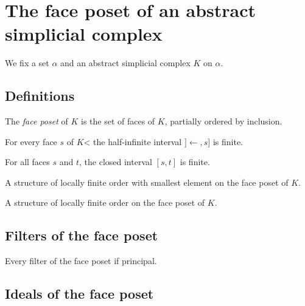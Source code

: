 \section{The face poset of an abstract simplicial complex}

We fix a set $\alpha$ and an abstract simplicial complex $K$ on $\alpha$.

\subsection{Definitions}

\begin{subdefi}[FacePoset] 
The \emph{face poset} of $K$ is the set of faces of $K$, partially ordered by inclusion.

\end{subdefi}

\begin{sublemma}
For every face $s$ of $K$< the half-infinite interval $]\leftarrow,s]$ is finite.

\end{sublemma}

\begin{sublemma}
For all faces $s$ and $t$, the closed interval $[s,t]$ is finite.

\end{sublemma}

\begin{subdefi}[FacePosetLFB]
A structure of locally finite order with smallest element on the face poset of $K$.

\end{subdefi}

\begin{subdefi}[FacePosetLF]
A structure of locally finite order on the face poset of $K$.

\end{subdefi}

\subsection{Filters of the face poset}

\begin{sublemma}
Every filter of the face poset if principal.

\end{sublemma}


\subsection{Ideals of the face poset}

